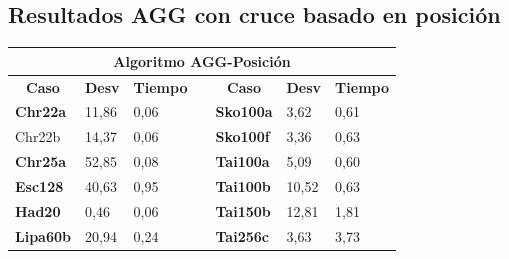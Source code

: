 \documentclass[a4paper, 12pt]{article}
\begin{document}
      \subsection{Resultados AGG con cruce basado en posición}
      \begin{table}[H]
\centering
\label{my-label}
\begin{tabular}{|l|l|l|l|l|l|l|}
\hline
\multicolumn{7}{|c|}{\textbf{Algoritmo AGG-Posición}}                                                                                                                                                       \\ \hline
\multicolumn{1}{|c|}{\textbf{Caso}} & \multicolumn{1}{c|}{\textbf{Desv}} & \multicolumn{1}{c|}{\textbf{Tiempo}} & \multicolumn{1}{c|}{} & \multicolumn{1}{c|}{\textbf{Caso}} & \multicolumn{1}{c|}{\textbf{Desv}} & \multicolumn{1}{c|}{\textbf{Tiempo}} \\ \cline{1-3} \cline{5-7} 
\textbf{Chr22a}                     & 11,86                     & 0,06                        &                       & \textbf{Sko100a}                   & 3,62                      & 0,61                        \\ \cline{1-3} \cline{5-7} 
Chr22b                     & 14,37                     & 0,06                        &                       & \textbf{Sko100f}                   & 3,36                      & 0,63                        \\ \cline{1-3} \cline{5-7} 
\textbf{Chr25a}                     & 52,85                     & 0,08                        &                       & \textbf{Tai100a}                   & 5,09                      & 0,60                        \\ \cline{1-3} \cline{5-7} 
\textbf{Esc128}                     & 40,63                     & 0,95                        &                       & \textbf{Tai100b}                   & 10,52                     & 0,63                        \\ \cline{1-3} \cline{5-7} 
\textbf{Had20}                      & 0,46                      & 0,06                        &                       & \textbf{Tai150b}                   & 12,81                     & 1,81                        \\ \cline{1-3} \cline{5-7} 
\textbf{Lipa60b}                    & 20,94                     & 0,24                        &                       & \textbf{Tai256c}                   & 3,63                      & 3,73                        \\ \cline{1-3} \cline{5-7} 

\end{tabular}
\end{table}
\end{document}

